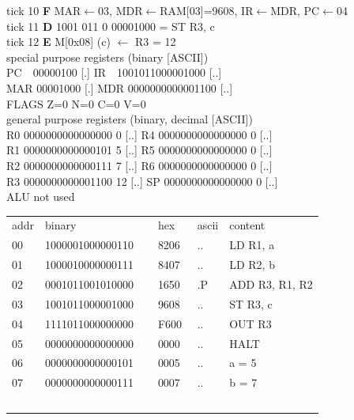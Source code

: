 \begin{tcolorbox}[stepbox, title={Instruction 3 \hfill ticks 7 to 9 \quad ADD R3, R1, R2}]
{\begin{tabular}{@{}lllll@{}}
\end{tabular}}
\end{tcolorbox}\hfill\begin{tcolorbox}[stepbox, title={Instruction 4 \hfill ticks 10 to 12 \quad ST R3, c}]
\textcolor{dim}{tick 10} \textbf{F} MAR$\leftarrow$03, MDR$\leftarrow$RAM[03]=9608, IR$\leftarrow$MDR, PC$\leftarrow$04\\
\textcolor{dim}{tick 11} \textbf{D} 1001 011 0 00001000 = ST R3, c\\
\textcolor{dim}{tick 12} \textbf{E} M[0x08] (c) $\leftarrow$ R3 = 12\\[2pt]
\textcolor{dim}{special purpose registers (binary [ASCII])}\\
PC~~00000100 [.] \hfill IR~~1001011000001000 [..]\\
MAR 00001000 [.] \hfill MDR 0000000000001100 [..]\\
FLAGS Z=0 N=0 C=0 V=0\\[2pt]
\textcolor{dim}{general purpose registers (binary, decimal [ASCII])}\\
R0 0000000000000000 0 [..] \hfill R4 0000000000000000 0 [..]\\
R1 0000000000000101 5 [..] \hfill R5 0000000000000000 0 [..]\\
R2 0000000000000111 7 [..] \hfill R6 0000000000000000 0 [..]\\
R3 0000000000001100 12 [..] \hfill SP 0000000000000000 0 [..]\\
\textcolor{dim}{ALU not used}\\[2pt]
{\setlength{\tabcolsep}{2pt}\begin{tabular}{@{}lllll@{}}
\textcolor{dim}{addr} & \textcolor{dim}{binary} & \textcolor{dim}{hex} & \textcolor{dim}{ascii} & \textcolor{dim}{content}\\
00 & 1000001000000110 & 8206 & .. & LD R1, a\\
01 & 1000010000000111 & 8407 & .. & LD R2, b\\
02 & 0001011001010000 & 1650 & .P & ADD R3, R1, R2\\
03 & 1001011000001000 & 9608 & .. & ST R3, c\\
\rowcolor{pcc}04 & 1111011000000000 & F600 & .. & OUT R3\\
05 & 0000000000000000 & 0000 & .. & HALT\\
\rowcolor{datac}06 & 0000000000000101 & 0005 & .. & a = 5\\
\rowcolor{datac}07 & 0000000000000111 & 0007 & .. & b = 7\\
\rowcolor{wrt}\textcolor{white}{\textbf{08}} & \textcolor{white}{\textbf{0000000000001100}} & \textcolor{white}{\textbf{000C}} & \textcolor{white}{\textbf{..}} & \textcolor{white}{\textbf{c = 12}}\\
\end{tabular}}
\end{tcolorbox}\par\vspace{3pt}
